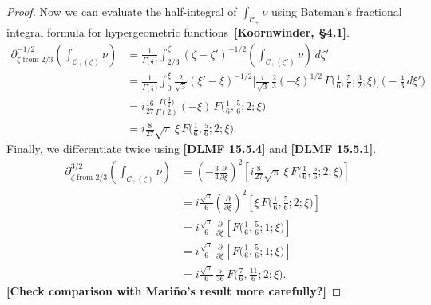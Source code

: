 \documentclass[11pt,a4paper,twoside,leqno,noamsfonts]{amsart}
\numberwithin{equation}{section}
\begin{document}
\begin{example}[Airy]
\begin{proof}
Now we can evaluate the half-integral of $\int_{\mathcal{C}_+} \nu$ using Bateman's fractional integral formula for hypergeometric functions~\textbf{[Koornwinder, \S 4.1]}.
\begin{align*}
\partial^{-1/2}_{\zeta \text{ from } 2/3} \left( \int_{\mathcal{C}_+(\zeta)} \nu \right) & = \frac{1}{\Gamma\big(\tfrac{1}{2}\big)} \int_{2/3}^\zeta (\zeta - \zeta')^{-1/2} \left( \int_{\mathcal{C}_+(\zeta')} \nu \right)\,d\zeta' \\
& = \frac{1}{\Gamma\big(\tfrac{1}{2}\big)} \int_0^\xi \tfrac{2}{\sqrt{3}} (\xi' - \xi)^{-1/2} \Big[ \tfrac{i}{\sqrt{3}}\,\tfrac{2}{3} (-\xi)^{1/2}\,F\big(\tfrac{1}{6}, \tfrac{5}{6}; \tfrac{3}{2}; \xi\big) \Big] \,\big( -\tfrac{4}{3}\,d\xi' \big) \\
& = i \frac{16}{27} \frac{\Gamma\big(\tfrac{3}{2}\big)}{\Gamma(2)} (-\xi)\,F\big(\tfrac{1}{6}, \tfrac{5}{6}; 2; \xi\big) \\
& = i \frac{8}{27} \sqrt{\pi}\,\xi\,F\big(\tfrac{1}{6}, \tfrac{5}{6}; 2; \xi\big).
\end{align*}
Finally, we differentiate twice using \textbf{[DLMF 15.5.4]} and \textbf{[DLMF 15.5.1]}.
\begin{align*}
\partial^{3/2}_{\zeta \text{ from } 2/3} \left( \int_{\mathcal{C}_+(\zeta)} \nu \right) & = \left(-\tfrac{3}{4} \tfrac{\partial}{\partial \xi}\right)^2 \left[ i \frac{8}{27} \sqrt{\pi}\,\xi\,F\big(\tfrac{1}{6}, \tfrac{5}{6}; 2; \xi\big) \right] \\
& = i \tfrac{\sqrt{\pi}}{6} \left(\tfrac{\partial}{\partial \xi}\right)^2 \left[ \xi\,F\big(\tfrac{1}{6}, \tfrac{5}{6}; 2; \xi\big) \right] \\
& = i \tfrac{\sqrt{\pi}}{6}\,\tfrac{\partial}{\partial \xi} \left[ F\big(\tfrac{1}{6}, \tfrac{5}{6}; 1; \xi\big) \right] \\
& = i \tfrac{\sqrt{\pi}}{6}\,\tfrac{\partial}{\partial \xi} \left[ F\big(\tfrac{1}{6}, \tfrac{5}{6}; 1; \xi\big) \right] \\
& = i \tfrac{\sqrt{\pi}}{6}\,\tfrac{5}{36}\,F\big(\tfrac{7}{6}, \tfrac{11}{6}; 2; \xi\big).
\end{align*}
\textbf{[Check comparison with Mari\~{n}o's result more carefully?]}
\end{proof}


\end{example}
\end{document}
